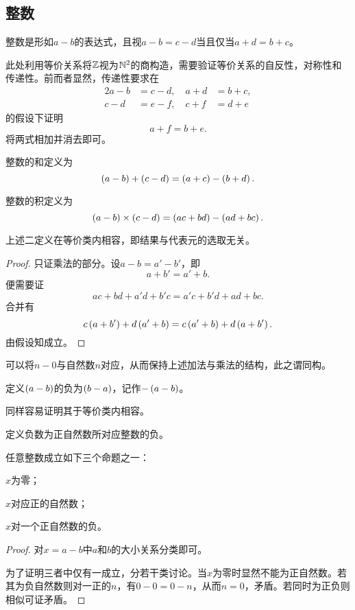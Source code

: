 \documentclass{ctexrep}
\begin{document}
  \subsection{整数}
  \begin{definition}
    整数是形如$a-b$的表达式，且视$a-b=c-d$当且仅当$a+d=b+c$。
  \end{definition}
  此处利用等价关系将$\mathbb{Z}$视为$\mathbb{N}^2$的商构造，需要验证等价关系的自反性，对称性和传递性。前而者显然，传递性要求在
  \begin{alignat*}{2}
    a-b&=c-d, \quad a+d &= b+c,\\
    c-d&=e-f, \quad c+f &= d+e
  \end{alignat*}
  的假设下证明
  \[ a+f = b+e. \]
  将两式相加并消去即可。
  \begin{definition}
    整数的和定义为
    \[ \left(a-b\right)+\left(c-d\right) = \left(a+c\right)-\left(b+d\right). \]
  \end{definition}
  \begin{definition}
    整数的积定义为
    \[ \left(a-b\right)\times\left(c-d\right) = \left(ac+bd\right)-\left(ad+bc\right). \]
  \end{definition}
  \begin{theorem}
    上述二定义在等价类内相容，即结果与代表元的选取无关。
  \end{theorem}
  \begin{proof}
    只证乘法的部分。设$a-b=a'-b'$，即
    \[ a+b' = a'+b. \]
    便需要证
    \[ ac+bd+a'd+b'c=a'c+b'd+ad+bc. \]
    合并有
    \[ c\left(a+b'\right)+d\left(a'+b\right) = c\left(a'+b\right)+d\left(a+b'\right). \]
    由假设知成立。
  \end{proof}
  可以将$n-0$与自然数$n$对应，从而保持上述加法与乘法的结构，此之谓同构。
  \begin{definition}
    定义$\left(a-b\right)$的负为$\left(b-a\right)$，记作$-\left(a-b\right)$。
  \end{definition}
  同样容易证明其于等价类内相容。
  \begin{definition}
    定义负数为正自然数所对应整数的负。
  \end{definition}
  \begin{theorem}
    任意整数成立如下三个命题之一：
    \begin{aenum}
      \item $x$为零；
      \item $x$对应正的自然数；
      \item $x$对一个正自然数的负。
    \end{aenum}
  \end{theorem}
  \begin{proof}
    对$x=a-b$中$a$和$b$的大小关系分类即可。
    \par
    为了证明三者中仅有一成立，分若干类讨论。当$x$为零时显然不能为正自然数。若其为负自然数则对一正的$n$，有$0-0=0-n$，从而$n=0$，矛盾。若同时为正负则相似可证矛盾。
  \end{proof}
\end{document}

